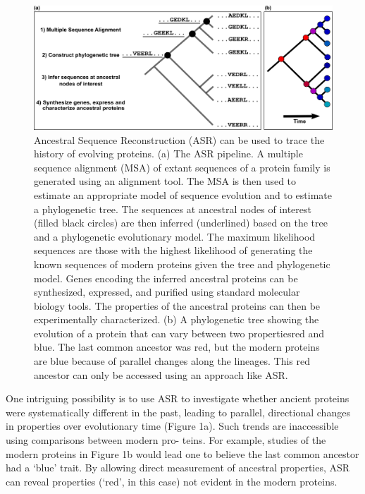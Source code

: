 \begin{figure}
\centering \includegraphics{ch2-fig1} \caption[Ancestral Sequence Reconstruction (ASR) can be used to trace\newline the history
of evolving proteins]{Ancestral Sequence Reconstruction (ASR) can be used to trace the
history of evolving proteins. (a) The ASR pipeline. A multiple sequence
alignment (MSA) of extant sequences of a protein family is generated
using an alignment tool. The MSA is then used to estimate an appropriate
model of sequence evolution and to estimate a phylogenetic tree. The
sequences at ancestral nodes of interest (filled black circles) are
then inferred (underlined) based on the tree and a phylogenetic evolutionary
model. The maximum likelihood sequences are those with the highest
likelihood of generating the known sequences of modern proteins given
the tree and phylogenetic model. Genes encoding the inferred ancestral
proteins can be synthesized, expressed, and purified using standard
molecular biology tools. The properties of the ancestral proteins
can then be experimentally characterized. (b) A phylogenetic tree
showing the evolution of a protein that can vary between two properties\textemdash red
and blue. The last common ancestor was red, but the modern proteins
are blue because of parallel changes along the lineages. This red
ancestor can only be accessed using an approach like ASR.\label{samplefigure}}
\end{figure}

One intriguing possibility is to use ASR to investigate whether ancient
proteins were systematically different in the past, leading to parallel,
directional changes in properties over evolutionary time (Figure
1a). Such trends are inaccessible using comparisons between modern
pro- teins. For example, studies of the modern proteins in Figure
1b would lead one to believe the last common ancestor had a \textquoteleft blue\textquoteright{}
trait. By allowing direct measurement of ancestral properties, ASR
can reveal properties (\textquoteleft red\textquoteright , in this
case) not evident in the modern proteins.

